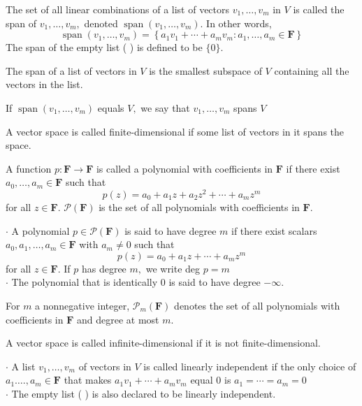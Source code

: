
The set of all linear combinations of a list of vectors $v_{1}, \ldots, v_{m}$ in $V$ is called the span of $v_{1}, \ldots, v_{m},$ denoted $\operatorname{span}\left(v_{1}, \ldots, v_{m}\right) .$ In other words,
$$
\operatorname{span}\left(v_{1}, \ldots, v_{m}\right)=\left\{a_{1} v_{1}+\cdots+a_{m} v_{m}: a_{1}, \ldots, a_{m} \in \mathbf{F}\right\}
$$
The span of the empty list ( ) is defined to be $\{0\} .$

The span of a list of vectors in $V$ is the smallest subspace of $V$ containing all the vectors in the list.

If $\operatorname{span}\left(v_{1}, \ldots, v_{m}\right)$ equals $V,$ we say that $v_{1}, \ldots, v_{m}$ spans $V$

A vector space is called finite-dimensional if some list of vectors in it spans the space.

A function $p: \mathbf{F} \rightarrow \mathbf{F}$ is called a polynomial with coefficients in $\mathbf{F}$ if there exist $a_{0}, \ldots, a_{m} \in \mathbf{F}$ such that
$$
p(z)=a_{0}+a_{1} z+a_{2} z^{2}+\cdots+a_{m} z^{m}
$$
for all $z \in \mathbf{F}$. 
$\mathcal{P}(\mathbf{F})$ is the set of all polynomials with coefficients in $\mathbf{F}$.

$\cdot$ A polynomial $p \in \mathcal{P}(\mathbf{F})$ is said to have degree $m$ if there exist scalars $a_{0}, a_{1}, \ldots, a_{m} \in \mathbf{F}$ with $a_{m} \neq 0$ such that
$$
p(z)=a_{0}+a_{1} z+\cdots+a_{m} z^{m}
$$
for all $z \in \mathbf{F} .$ If $p$ has degree $m,$ we write deg $p=m$ \\
$\cdot$ The polynomial that is identically 0 is said to have degree $-\infty$.

For $m$ a nonnegative integer, $\mathcal{P}_{m}(\mathbf{F})$ denotes the set of all polynomials with coefficients in $\mathbf{F}$ and degree at most $m .$

A vector space is called infinite-dimensional if it is not finite-dimensional.

$\cdot$ A list $v_{1}, \ldots, v_{m}$ of vectors in $V$ is called linearly independent if the only choice of $a_{1} \ldots ., a_{m} \in \mathbf{F}$ that makes $a_{1} v_{1}+\cdots+a_{m} v_{m}$
equal 0 is $a_{1}=\cdots=a_{m}=0$ \\
$\cdot$ The empty list ( ) is also declared to be linearly independent.

